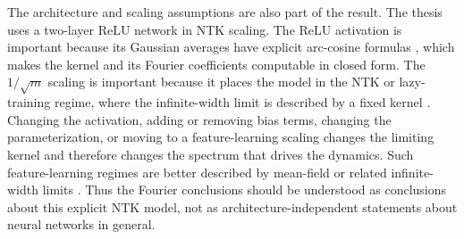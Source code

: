 The architecture and scaling assumptions are also part of the result. The thesis
uses a two-layer ReLU network in NTK scaling. The ReLU activation is important
because its Gaussian averages have explicit arc-cosine formulas
\citep{cho2009kernel}, which makes the kernel and its Fourier coefficients
computable in closed form. The \(1/\sqrt m\) scaling is important because it
places the model in the NTK or lazy-training regime, where the infinite-width
limit is described by a fixed kernel
\citep{jacot2018ntk,lee2020wide,golikov2022neuraltangentkernelsurvey}.
Changing the activation, adding or removing bias terms, changing the
parameterization, or moving to a feature-learning scaling changes the limiting
kernel and therefore changes the spectrum that drives the dynamics. Such
feature-learning regimes are better described by mean-field or related
infinite-width limits
\citep{Mei2018meanfieldview,chizat2018globalconvergencegradientdescent,sirignano2019meanfieldanalysisneural,Rotskoff_2022}.
Thus the Fourier conclusions should be understood as conclusions about this
explicit NTK model, not as architecture-independent statements about neural
networks in general.
